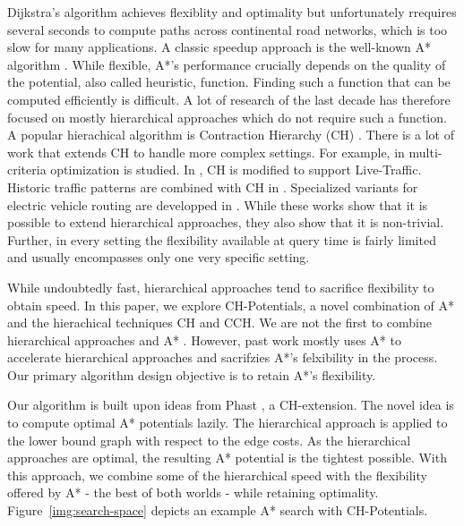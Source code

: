 \documentclass[a4paper,UKenglish,cleveref, autoref]{lipics-v2019}
\begin{document}
Dijkstra's algorithm \cite{d-ntpcg-59} achieves flexiblity and optimality but unfortunately rrequires several seconds to compute paths across continental road networks, which is too slow for many applications.
A classic speedup approach is the well-known A* algorithm \cite{hnr-afbhd-68}.
While flexible, A*'s performance crucially depends on the quality of the potential, also called heuristic, function.
Finding such a function that can be computed efficiently is difficult.
A lot of research of the last decade has therefore focused on mostly hierarchical approaches \cite{gssv-erlrn-12,dsw-cch-15,dgpw-crprn-13,ss-ehh-12} which do not require such a function.
A popular hierachical algorithm is Contraction Hierarchy (CH) \cite{gssv-erlrn-12}.
There is a lot of work that extends CH to handle more complex settings.
For example, in \cite{fns-opca-14,gks-rpfof-10} multi-criteria optimization is studied.
In \cite{dsw-cch-15}, CH is modified to support Live-Traffic.
Historic traffic patterns are combined with CH in \cite{swz-sfert-19,bgsv-mtdtt-13,bdpw-dtdrp-16}.
Specialized variants for electric vehicle routing are developped in \cite{bdgwz-sfpcs-19}.
While these works show that it is possible to extend hierarchical approaches, they also show that it is non-trivial.
Further, in every setting the flexibility available at query time is fairly limited and usually encompasses only one very specific setting.

While undoubtedly fast, hierarchical approaches tend to sacrifice flexibility to obtain speed.
In this paper, we explore CH-Potentials, a novel combination of A* and the hierachical techniques CH and CCH.
We are not the first to combine hierarchical approaches and A* \cite{bdsssw-chgds-10, gkw-blwr-07, bdgwz-sfpcs-19}.
However, past work mostly uses A* to accelerate hierarchical approaches and sacrifzies A*'s felxibility in the process.
Our primary algorithm design objective is to retain A*'s flexibility.

Our algorithm is built upon ideas from Phast \cite{dgnw-phast-13}, a CH-extension.
The novel idea is to compute optimal A* potentials lazily.
The hierarchical approach is applied to the lower bound graph with respect to the edge costs.
As the hierarchical approaches are optimal, the resulting A* potential is the tightest possible.
With this approach, we combine some of the hierarchical speed with the flexibility offered by A* - the best of both worlds - while retaining optimality.
Figure~\ref{img:search-space} depicts an example A* search with CH-Potentials.
\end{document}
